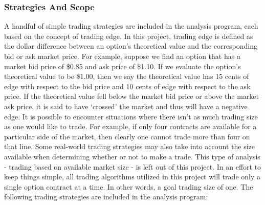 \documentclass[12pt, a4paper, notitlepage]{article}
\numberwithin{equation}{subsection}
\numberwithin{figure}{subsection}
\numberwithin{table}{subsection}
\newcommand{\newpar}{\newline \newline}
\begin{document}
\subsubsection{Strategies And Scope}
\label{subsec:TradingStrategiesAndScope}
A handful of simple trading strategies are included in the analysis program, each based on the concept of trading edge.  In this project, trading edge is defined as the dollar difference between an option's theoretical value and the corresponding bid or ask market price.  For example, suppose we find an option that has a market bid price of \$0.85 and ask price of \$1.10.  If we evaluate the option's theoretical value to be \$1.00, then we say the theoretical value has 15 cents of edge with respect to the bid price and 10 cents of edge with respect to the ask price.  If the theoretical value fell below the market bid price or above the market ask price, it is said to have `crossed' the market and thus will have a negative edge.
\newpar
It is possible to encounter situations where there isn't as much trading size as one would like to trade.  For example, if only four contracts are available for a particular side of the market, then clearly one cannot trade more than four on that line.  Some real-world trading strategies may also take into account the size available when determining whether or not to make a trade.  This type of analysis - trading based on available market size - is left out of this project.  In an effort to keep things simple, all trading algorithms utilized in this project will trade only a single option contract at a time.  In other words, a goal trading size of one.
\newpar
The following trading strategies are included in the analysis program:
\end{document}
